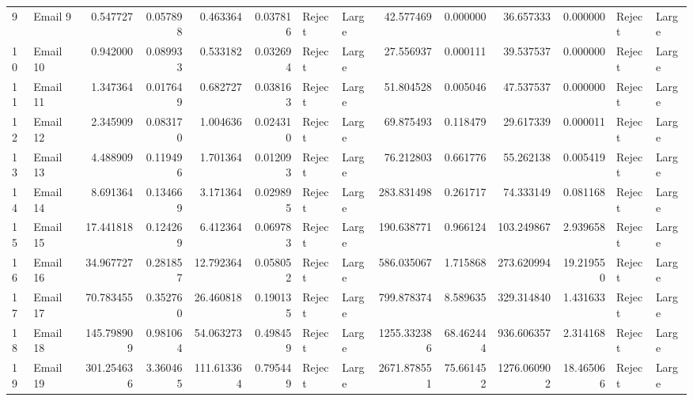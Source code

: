 \begin{tabular}{llrrrrllrrrrll}
9  &   Email 9 &           0.547727 &  0.057898 &            0.463364 &  0.037816 &   Reject &       Large &                42.577469 &   0.000000 &                 36.657333 &   0.000000 &  Reject &       Large \\
10 &  Email 10 &           0.942000 &  0.089933 &            0.533182 &  0.032694 &   Reject &       Large &                27.556937 &   0.000111 &                 39.537537 &   0.000000 &  Reject &       Large \\
11 &  Email 11 &           1.347364 &  0.017649 &            0.682727 &  0.038163 &   Reject &       Large &                51.804528 &   0.005046 &                 47.537537 &   0.000000 &  Reject &       Large \\
12 &  Email 12 &           2.345909 &  0.083170 &            1.004636 &  0.024310 &   Reject &       Large &                69.875493 &   0.118479 &                 29.617339 &   0.000011 &  Reject &       Large \\
13 &  Email 13 &           4.488909 &  0.119496 &            1.701364 &  0.012093 &   Reject &       Large &                76.212803 &   0.661776 &                 55.262138 &   0.005419 &  Reject &       Large \\
14 &  Email 14 &           8.691364 &  0.134669 &            3.171364 &  0.029895 &   Reject &       Large &               283.831498 &   0.261717 &                 74.333149 &   0.081168 &  Reject &       Large \\
15 &  Email 15 &          17.441818 &  0.124269 &            6.412364 &  0.069783 &   Reject &       Large &               190.638771 &   0.966124 &                103.249867 &   2.939658 &  Reject &       Large \\
16 &  Email 16 &          34.967727 &  0.281857 &           12.792364 &  0.058052 &   Reject &       Large &               586.035067 &   1.715868 &                273.620994 &  19.219550 &  Reject &       Large \\
17 &  Email 17 &          70.783455 &  0.352760 &           26.460818 &  0.190135 &   Reject &       Large &               799.878374 &   8.589635 &                329.314840 &   1.431633 &  Reject &       Large \\
18 &  Email 18 &         145.798909 &  0.981064 &           54.063273 &  0.498459 &   Reject &       Large &              1255.332386 &  68.462444 &                936.606357 &   2.314168 &  Reject &       Large \\
19 &  Email 19 &         301.254636 &  3.360465 &          111.613364 &  0.795449 &   Reject &       Large &              2671.878551 &  75.661452 &               1276.060902 &  18.465066 &  Reject &       Large \\
\bottomrule
\end{tabular}

